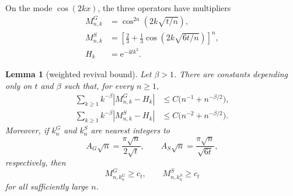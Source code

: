 \documentclass[11pt,a4paper]{article}
\newtheorem{lemma}{Lemma}
\newcommand{\e}{\mathrm e}
\begin{document}
On the mode $\cos(2kx)$, the three operators have multipliers
\begin{align}
 M^G_{n,k}&=\cos^{2n}\!\left(2k\sqrt{t/n}\right),\label{eq:MG}\\
 M^S_{n,k}&=\left[\frac23+\frac13
 \cos\!\left(2k\sqrt{6t/n}\right)\right]^n,\label{eq:MS}\\
 H_k&=\e^{-4tk^2}.\label{eq:H}
\end{align}

\begin{lemma}[weighted revival bound]\label{lem:revival}
Let $\beta>1$.  There are constants depending only on $t$ and $\beta$ such
that, for every $n\ge1$,
\begin{align}
 \sum_{k\ge1}k^{-\beta}|M^G_{n,k}-H_k|
 &\le C\bigl(n^{-1}+n^{-\beta/2}\bigr),\label{eq:sumG}\\
 \sum_{k\ge1}k^{-\beta}|M^S_{n,k}-H_k|
 &\le C\bigl(n^{-2}+n^{-\beta/2}\bigr).\label{eq:sumS}
\end{align}
Moreover, if $k^G_n$ and $k^S_n$ are nearest integers to
\[
 A_G\sqrt n=\frac{\pi\sqrt n}{2\sqrt t},
 \qquad
 A_S\sqrt n=\frac{\pi\sqrt n}{\sqrt{6t}},
\]
respectively, then
\begin{equation}\label{eq:revival-lower}
 M^G_{n,k^G_n}\ge c_t,\qquad M^S_{n,k^S_n}\ge c_t
\end{equation}
for all sufficiently large $n$.
\end{lemma}
\end{document}
